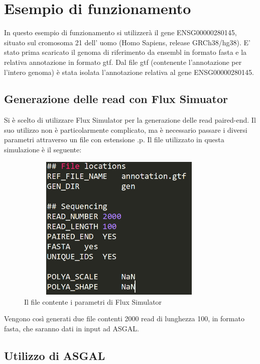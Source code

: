 \section{Esempio di funzionamento}

In questo esempio di funzionamento si utilizzerà il gene ENSG00000280145, situato sul cromosoma 21 dell' uomo (Homo Sapiens, release GRCh38/hg38). E' stato prima scaricato il genoma di riferimento da ensembl in formato fasta e la relativa annotazione in formato gtf. Dal file gtf (contenente l'annotazione per l'intero genoma) è stata isolata l'annotazione relativa al gene ENSG00000280145.

\subsection{Generazione delle read con Flux Simuator}

Si è scelto di utilizzare Flux Simulator per la generazione delle read paired-end. Il suo utilizzo non è particolarmente complicato, ma è necessario passare i diversi parametri attraverso un file con estensione .p. Il file utilizzato in questa simulazione è il seguente:

\begin{figure}[h]
	\centering
	\includegraphics[height=7cm,width=10cm]{images/parameters2.png}
  \caption{Il file contente i parametri di Flux Simulator}
  \label{fig:Parameters}
\end{figure}

Vengono così generati due file contenti 2000 read di lunghezza 100, in formato fasta, che saranno dati in input ad ASGAL.

\newpage

\subsection{Utilizzo di ASGAL}


